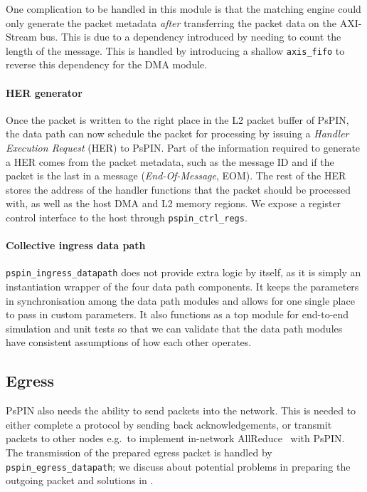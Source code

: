 One complication to be handled in this module is that the matching engine could only generate the packet metadata \emph{after} transferring the packet data on the AXI-Stream bus.  This is due to a dependency introduced by needing to count the length of the message.  This is handled by introducing a shallow \texttt{axis\_\-fifo} to reverse this dependency for the DMA module.

\paragraph{HER generator} Once the packet is written to the right place in the L2 packet buffer of PsPIN, the data path can now schedule the packet for processing by issuing a \emph{Handler Execution Request} (HER) to PsPIN.  Part of the information required to generate a HER comes from the packet metadata, such as the message ID and if the packet is the last in a message (\emph{End-Of-Message}, EOM).  The rest of the HER stores the address of the handler functions that the packet should be processed with, as well as the host DMA and L2 memory regions.  We expose a register control interface to the host through \texttt{pspin\_\-ctrl\_\-regs}.

\paragraph{Collective ingress data path} \texttt{pspin\_\-ingress\_\-datapath} does not provide extra logic by itself, as it is simply an instantiation wrapper of the four data path components.  It keeps the parameters in synchronisation among the data path modules and allows for one single place to pass in custom parameters.  It also functions as a top module for end-to-end simulation and unit tests so that we can validate that the data path modules have consistent assumptions of how each other operates.
 
\subsection{Egress}

PsPIN also needs the ability to send packets into the network.  This is needed to either complete a protocol by sending back acknowledgements, or transmit packets to other nodes e.g.\ to implement in-network AllReduce~\cite{de_sensi_flare_2021} with PsPIN.  The transmission of the prepared egress packet is handled by \texttt{pspin\_\-egress\_\-datapath}; we discuss about potential problems in preparing the outgoing packet and solutions in .

